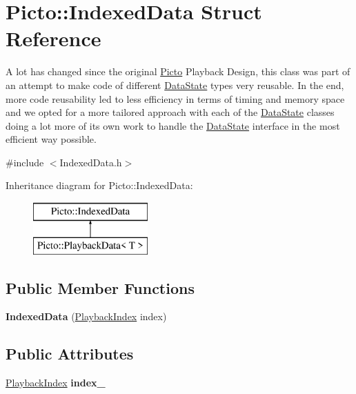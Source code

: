 \hypertarget{struct_picto_1_1_indexed_data}{\section{Picto\-:\-:Indexed\-Data Struct Reference}
\label{struct_picto_1_1_indexed_data}
}


A lot has changed since the original \hyperlink{namespace_picto}{Picto} Playback Design, this class was part of an attempt to make code of different \hyperlink{class_picto_1_1_data_state}{Data\-State} types very reusable. In the end, more code reusability led to less efficiency in terms of timing and memory space and we opted for a more tailored approach with each of the \hyperlink{class_picto_1_1_data_state}{Data\-State} classes doing a lot more of its own work to handle the \hyperlink{class_picto_1_1_data_state}{Data\-State} interface in the most efficient way possible.  




{\ttfamily \#include $<$Indexed\-Data.\-h$>$}

Inheritance diagram for Picto\-:\-:Indexed\-Data\-:\begin{figure}[H]
\begin{center}
\leavevmode
\includegraphics[height=2.000000cm]{struct_picto_1_1_indexed_data}
\end{center}
\end{figure}
\subsection*{Public Member Functions}
\begin{DoxyCompactItemize}
\item 
\hypertarget{struct_picto_1_1_indexed_data_aaa8e875605f351efd844b3d322c19d8d}{{\bfseries Indexed\-Data} (\hyperlink{struct_picto_1_1_playback_index}{Playback\-Index} index)}\label{struct_picto_1_1_indexed_data_aaa8e875605f351efd844b3d322c19d8d}

\end{DoxyCompactItemize}
\subsection*{Public Attributes}
\begin{DoxyCompactItemize}
\item 
\hypertarget{struct_picto_1_1_indexed_data_a26ec7782b7bd439519b5848ec46c54c4}{\hyperlink{struct_picto_1_1_playback_index}{Playback\-Index} {\bfseries index\-\_\-}}\label{struct_picto_1_1_indexed_data_a26ec7782b7bd439519b5848ec46c54c4}

\end{DoxyCompactItemize}


